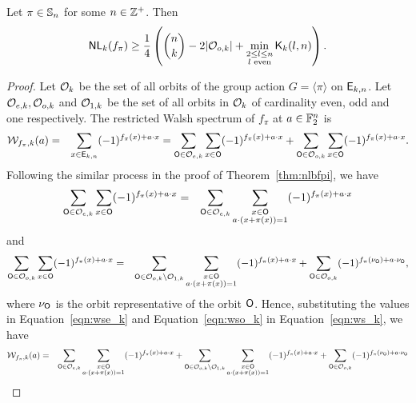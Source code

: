\documentclass{llncs}
\begin{document}
\begin{theorem}\label{thm:NLkb}
Let $\pi \in \mathbb{S}_n$ for some $n \in \mathbb{Z}^+$.
Then $$\mathsf{NL}_{k}(f_\pi) \geq \frac{1}{4}\left({n \choose k} - 2|\mathcal{O}_{o,k}| + \min_{\substack{2 \leq l \leq n \\ l \text{ even}}} \mathsf{K}_{k}(l,n)\right).$$
\end{theorem}
\begin{proof}
Let $\mathcal{O}_k$ be the set of all orbits of the group action $G = \langle \pi \rangle$ on $\mathsf{E}_{k,n}$.
Let $\mathcal{O}_{e,k}, \mathcal{O}_{o,k}$ and $\mathcal{O}_{1,k}$ be the set of all orbits in $\mathcal{O}_k$ of cardinality even, odd and one respectively. The restricted Walsh spectrum of $f_\pi$ at $a \in \mathbb{F}_2^n$ is
\begin{eqnarray} \label{eqn:ws_k}
\mathcal{W}_{f_\pi,k}(a) & =  & \sum_{x \in \mathsf{E}_{k,n}} (-1)^{f_\pi (x)+a \cdot x} 
 = \sum_{\mathsf{O} \in \mathcal{O}_{e,k}} \sum_{x \in \mathsf{O}} (-1)^{ f_\pi (x) + a \cdot x} + \sum_{\mathsf{O} \in \mathcal{O}_{o,k}} \sum_{x \in \mathsf{O}} (-1)^{ f_\pi (x) + a \cdot x}.
\end{eqnarray}
Following the similar process in the proof of Theorem~\ref{thm:nlbfpi}, we have
\begin{eqnarray}\label{eqn:wse_k}
\sum_{\mathsf{O} \in \mathcal{O}_{e,k}} \sum_{x \in \mathsf{O}} (-1)^{ f_\pi(x) + a \cdot x} 
& = & \sum_{\mathsf{O} \in \mathcal{O}_{e,k}} \sum_{\substack{x \in \mathsf{O} \\ a \cdot (x + \pi(x))= 1}} (-1)^{f_\pi(x)+ a \cdot x} 
\end{eqnarray}
and 
\begin{eqnarray}\label{eqn:wso_k}
\sum_{\mathsf{O} \in \mathcal{O}_{o,k}} \sum_{x \in \mathsf{O}} (-1)^{ f_\pi(x) + a \cdot x} 
& = & \sum_{\mathsf{O} \in \mathcal{O}_{o,k}\setminus \mathcal{O}_{1,k}} \sum_{\substack{x \in \mathsf{O} \\ a \cdot (x + \pi(x))= 1}} (-1)^{f_\pi(x)+ a \cdot x} + \sum_{\mathsf{O} \in \mathcal{O}_{o,k}} (-1)^{ f_\pi(\nu_{\mathsf{O}}) + a \cdot \nu_{\mathsf{O}}},
\end{eqnarray}
where $\nu_{\mathsf{O}}$ is the orbit representative of the orbit $\mathsf{O}$.
Hence, substituting the values in Equation~\ref{eqn:wse_k} and Equation~\ref{eqn:wso_k} in Equation~\ref{eqn:ws_k}, we have
\begin{eqnarray*}
\wtk{f_\pi}{k}(a) & =  & \sum_{\orb \in \orbs_{e,k}} \sum_{\substack{x \in \orb \\ a \cdot (x + \pi(x))= 1}} (-1)^{f_\pi(x)+ a \cdot x} + \sum_{\orb \in \orbs_{o,k}\setminus \orbs_{1,k}} \sum_{\substack{x \in \orb \\ a \cdot (x + \pi(x))= 1}} (-1)^{f_\pi(x)+ a \cdot x} + \sum_{\orb \in \orbs_{o,k}} (-1)^{ f_\pi(\nu_\orb) + a \cdot \nu_\orb} \nonumber \\

\end{eqnarray*}
\end{proof}
\end{document}
